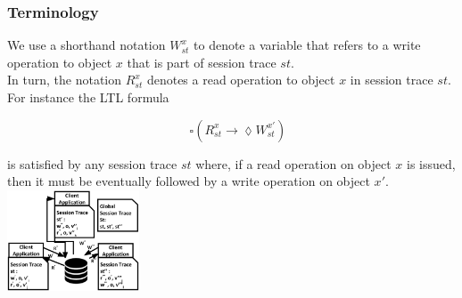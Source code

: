 \documentclass{beamer}
\begin{document}
 \begin{frame}
 \frametitle{Terminology}
 
 We use a shorthand notation $W^{x}_{st}$ to denote a variable that refers to a write operation to object $x$ that is part of session trace $st$. \\
 In turn, the notation $R^{x}_{st}$ denotes a read operation to object $x$ in session trace $st$.\\
 
 For instance the LTL formula
 
 $$ \quad \square \left( R_\mathit{st}^x \rightarrow \lozenge W_\mathit{st}^{x'} \right) $$
 
 \noindent is satisfied by any session trace $st$ where, if a read operation on object $x$ is issued, then it must be eventually followed by a write operation on object $x'$.
 	\includegraphics[height=3cm]{system.eps}
 
\end{frame}
\end{document}
